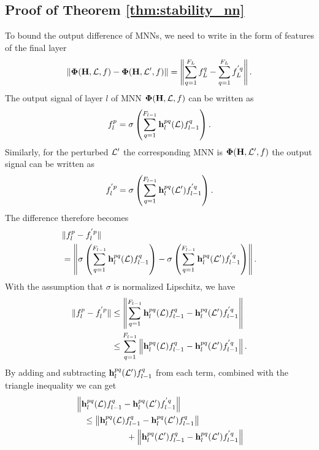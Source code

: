 \setcounter{subsection}{1}
\subsection{Proof of Theorem \ref{thm:stability_nn}}
\label{app:stability_nn}
To bound the output difference of MNNs, we need to write in the form of features of the final layer
 \begin{equation}
 \|\bm\Phi({\mathbf H},{\mathcal L},f)-\bm\Phi({\mathbf H},{\mathcal L}',f)\| =  \left\| \sum_{q=1}^{F_L} f_L^q - \sum_{q=1}^{F_L} f_L^{'q}\right\|.
 \end{equation}
The output signal of layer $l$ of MNN $\boldsymbol{\Phi}({\mathbf H},{\mathcal L}, f)$ can be written as
\begin{equation}
 f_l^p = \sigma\left( \sum_{q=1}^{F_{l-1}} {\mathbf h}_l^{pq}({\mathcal L}) f_{l-1}^q\right).
\end{equation}
Similarly, for the perturbed ${\mathcal L}'$ the corresponding MNN is $\boldsymbol{\Phi}({\mathbf H},{\mathcal L}',f)$ the output signal can be written as
 \begin{equation}
 f_l^{'p} = \sigma\left( \sum_{q=1}^{F_{l-1}} {\mathbf h}_l^{pq}({\mathcal L}') f_{l-1}^{'q}\right).
 \end{equation}
The difference therefore becomes
 \begin{align}
 &\nonumber\| f_l^p - f_l^{'p} \| \\& =\left\|  \sigma\left( \sum_{q=1}^{F_{l-1}} {\mathbf h}_l^{pq}({\mathcal L}) f_{l-1}^q\right) -  \sigma\left( \sum_{q=1}^{F_{l-1}} {\mathbf h}_l^{pq}({\mathcal L}') f_{l-1}^{'q}\right) \right\|.   
 \end{align}
With the assumption that $\sigma$ is normalized Lipschitz, we have
 \begin{align}
  \| f_l^p - f_l^{'p} \| &\leq \left\| \sum_{q=1}^{F_{l-1}}  {\mathbf h}_l^{pq}({\mathcal L}) f_{l-1}^q - {\mathbf h}_l^{pq}({\mathcal L}') f_{l-1}^{'q}  \right\| \\&\leq \sum_{q=1}^{F_{l-1}} \left\|  {\mathbf h}_l^{pq}({\mathcal L}) f_{l-1}^q - {\mathbf h}_l^{pq}({\mathcal L}') f_{l-1}^{'q} \right\|.
 \end{align}
By adding and subtracting ${\mathbf h}_l^{pq}({\mathcal L}') f_{l-1}^{q}$ from each term, combined with the triangle inequality we can get
 \begin{align}
 & \nonumber \left\|  {\mathbf h}_l^{pq}({\mathcal L}) f_{l-1}^q - {\mathbf h}_l^{pq}({\mathcal L}') f_{l-1}^{'q} \right\| \\\nonumber &\quad \leq \left\|  {\mathbf h}_l^{pq}({\mathcal L}) f_{l-1}^q - {\mathbf h}_l^{pq}({\mathcal L}') f_{l-1}^{q} \right\| \\&\qquad \qquad \qquad + \left\| {\mathbf h}_l^{pq}({\mathcal L}') f_{l-1}^q - {\mathbf h}_l^{pq}({\mathcal L}') f_{l-1}^{'q} \right\|
 \end{align}
